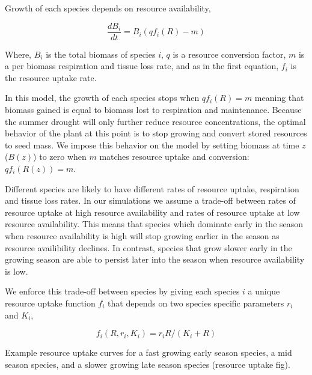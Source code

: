 \documentclass[12pt,]{article}
\begin{document}
Growth of each species depends on resource availability,

\vspace{-1em}

\begin{equation} \label{eq5}
\frac{dB_{i}}{dt} = B_{i}(qf_i(R) - m)
\end{equation}

Where, \(B_i\) is the total biomass of species \(i\), \(q\) is a
resource conversion factor, \(m\) is a per biomass respiration and
tissue loss rate, and as in the first equation, \(f_i\) is the resource
uptake rate.

In this model, the growth of each species stops when \(qf_i(R) = m\)
meaning that biomass gained is equal to biomass lost to respiration and
maintenance. Because the summer drought will only further reduce
resource concentrations, the optimal behavior of the plant at this point
is to stop growing and convert stored resources to seed mass. We impose
this behavior on the model by setting biomass at time \(z\) (\(B(z)\))
to zero when \(m\) matches resource uptake and conversion:
\(qf_i(R(z)) = m\).

Different species are likely to have different rates of resource uptake,
respiration and tissue loss rates. In our simulations we assume a
trade-off between rates of resource uptake at high resource availability
and rates of resource uptake at low resource availability. This means
that species which dominate early in the season when resource
availability is high will stop growing earlier in the season as resource
availibility declines. In contrast, species that grow slower early in
the growing season are able to persist later into the season when
resource availability is low.

We enforce this trade-off between species by giving each species \(i\) a
unique resource uptake function \(f_i\) that depends on two species
specific parameters \(r_i\) and \(K_i\),

\vspace{-1em}

\begin{equation} \label{eq7}
f_i(R, r_i, K_i) = r_iR/(K_i + R)
\end{equation}

Example resource uptake curves for a fast growing early season species,
a mid season species, and a slower growing late season species (resource
uptake fig).
\end{document}
